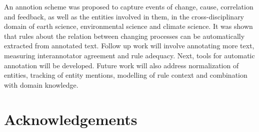 \documentclass[10pt, a4paper]{article}
\begin{document}
An annotion scheme was proposed to capture events of change, cause, correlation and feedback, as well as  the entities involved in them, in the cross-disciplinary domain of earth science, environmental science and climate science.
It was shown that rules about the relation between changing processes can be automatically extracted from annotated text.
Follow up work will involve annotating more text, measuring interannotator agreement and rule adequacy.
Next, tools for automatic annotation will be developed.
Future work will also address normalization of entities, tracking of entity mentions, modelling of rule context and combination with domain knowledge. 

 
\section{Acknowledgements}




\end{document}
